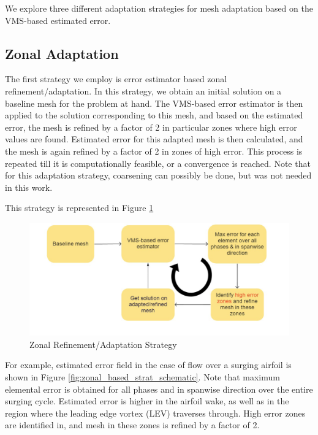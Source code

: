 We explore three different adaptation strategies for mesh adaptation based on the VMS-based estimated error. 

\subsection{Zonal Adaptation}



The first strategy we employ is error estimator based zonal refinement/adaptation. 
In this strategy, we obtain an initial solution on a baseline mesh for the problem at hand. The VMS-based error estimator is then applied to the solution corresponding to this mesh, and based on the estimated error, the mesh is refined by a factor of 2 in particular zones where high error values are found. Estimated error for this adapted mesh is then calculated, and the mesh is again refined by a factor of 2 in zones of high error. This process is repeated till it is computationally feasible, or a convergence is reached.
Note that for this adaptation strategy, coarsening can possibly be done, but was not needed in this work.

This strategy is represented in Figure \ref{fig:zonal_based_strat}

\begin{figure}[H]
	\centering
	\includegraphics[width=1\textwidth]{figures/adapt_strat/zonal_based.png}
	\caption{Zonal Refinement/Adaptation Strategy}
	\label{fig:zonal_based_strat}
\end{figure}

For example, estimated error field in the case of flow over a surging airfoil is shown in Figure \ref{fig:zonal_based_strat_schematic}.
Note that maximum elemental error is obtained for all phases and in spanwise direction over the entire surging cycle.
Estimated error is higher in the airfoil wake, as well as in the region where the leading edge vortex (LEV) traverses through.
High error zones are identified in, and mesh in these zones is refined by a factor of 2.

